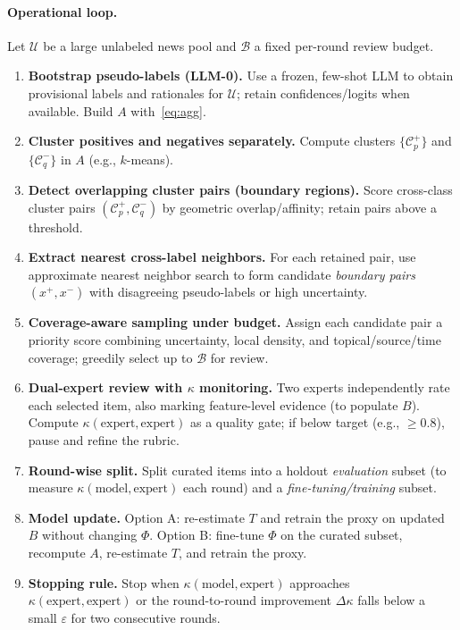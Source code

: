 \documentclass[ai,article,submit,pdftex,moreauthors]{Definitions/mdpi}
\begin{document}
\paragraph{Operational loop.}
Let $\mathcal{U}$ be a large unlabeled news pool and $\mathcal{B}$ a fixed per-round review budget.
\begin{enumerate}[label=\textbf{L\arabic*}.]
\item \textbf{Bootstrap pseudo-labels (LLM-0).} Use a frozen, few-shot LLM to obtain provisional labels and rationales for $\mathcal{U}$; retain confidences/logits when available. Build $A$ with~\eqref{eq:agg}. 
\item \textbf{Cluster positives and negatives separately.} Compute clusters $\{\mathcal{C}^{+}_p\}$ and $\{\mathcal{C}^{-}_q\}$ in $A$ (e.g., $k$-means). 
\item \textbf{Detect overlapping cluster pairs (boundary regions).} Score cross-class cluster pairs $(\mathcal{C}^{+}_p,\mathcal{C}^{-}_q)$ by geometric overlap/affinity; retain pairs above a threshold.
\item \textbf{Extract nearest cross-label neighbors.} For each retained pair, use approximate nearest neighbor search to form candidate \emph{boundary pairs} $(x^{+},x^{-})$ with disagreeing pseudo-labels or high uncertainty.
\item \textbf{Coverage-aware sampling under budget.} Assign each candidate pair a priority score combining uncertainty, local density, and topical/source/time coverage; greedily select up to $\mathcal{B}$ for review.
\item \textbf{Dual-expert review with $\kappa$ monitoring.} Two experts independently rate each selected item, also marking feature-level evidence (to populate $B$). Compute $\kappa(\text{expert},\text{expert})$ as a quality gate; if below target (e.g., $\geq 0.8$), pause and refine the rubric.
\item \textbf{Round-wise split.} Split curated items into a holdout \emph{evaluation} subset (to measure $\kappa(\text{model},\text{expert})$ each round) and a \emph{fine-tuning/training} subset.
\item \textbf{Model update.} Option A: re-estimate $T$ and retrain the proxy on updated $B$ without changing $\Phi$. Option B: fine-tune $\Phi$ on the curated subset, recompute $A$, re-estimate $T$, and retrain the proxy.
\item \textbf{Stopping rule.} Stop when $\kappa(\text{model},\text{expert})$ approaches $\kappa(\text{expert},\text{expert})$ or the round-to-round improvement $\Delta\kappa$ falls below a small $\varepsilon$ for two consecutive rounds.
\end{enumerate}
%
%  
%  
\end{document}
